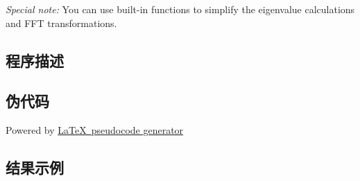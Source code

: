 \noindent \textit{Special note:} You can use built-in functions to simplify the eigenvalue calculations and FFT transformations.


\subsection{程序描述}

\subsection{伪代码}
Powered by \href{https://chatgpt.com/g/g-xJJAA2awf-latex-pseudocode-generator}{\LaTeX \ pseudocode generator}

\subsection{结果示例}


